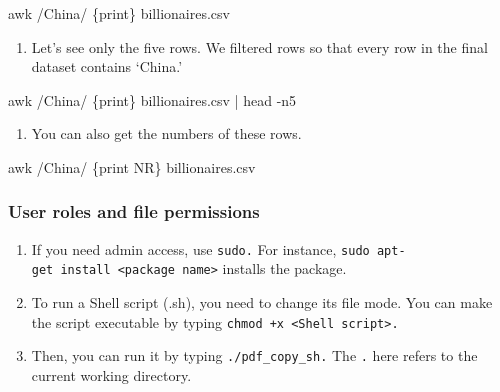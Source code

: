 \documentclass[
  letterpaper,
  DIV=11,
  numbers=noendperiod]{scrreprt}
\newenvironment{Shaded}{\begin{snugshade}}{\end{snugshade}}
\newcommand{\AttributeTok}[1]{\textcolor[rgb]{0.40,0.45,0.13}{#1}}
\newcommand{\FunctionTok}[1]{\textcolor[rgb]{0.28,0.35,0.67}{#1}}
\newcommand{\KeywordTok}[1]{\textcolor[rgb]{0.00,0.23,0.31}{#1}}
\newcommand{\NormalTok}[1]{\textcolor[rgb]{0.00,0.23,0.31}{#1}}
\newcommand{\StringTok}[1]{\textcolor[rgb]{0.13,0.47,0.30}{#1}}
\providecommand{\tightlist}{%
  \setlength{\itemsep}{0pt}\setlength{\parskip}{0pt}}\usepackage{longtable,booktabs,array}
\begin{document}
\begin{Shaded}
\begin{Highlighting}[]
\FunctionTok{awk} \StringTok{\textquotesingle{}/China/ \{print\}\textquotesingle{}}\NormalTok{ billionaires.csv}
\end{Highlighting}
\end{Shaded}

\begin{enumerate}
\def\labelenumi{\arabic{enumi}.}
\setcounter{enumi}{2}
\tightlist
\item
  Let's see only the five rows. We filtered rows so that every row in
  the final dataset contains `China.'
\end{enumerate}

\begin{Shaded}
\begin{Highlighting}[]
\FunctionTok{awk} \StringTok{\textquotesingle{}/China/ \{print\}\textquotesingle{}}\NormalTok{ billionaires.csv }\KeywordTok{|} \FunctionTok{head} \AttributeTok{{-}n5} 
\end{Highlighting}
\end{Shaded}

\begin{enumerate}
\def\labelenumi{\arabic{enumi}.}
\setcounter{enumi}{3}
\tightlist
\item
  You can also get the numbers of these rows.
\end{enumerate}

\begin{Shaded}
\begin{Highlighting}[]
\FunctionTok{awk} \StringTok{\textquotesingle{}/China/ \{print NR\}\textquotesingle{}}\NormalTok{ billionaires.csv }
\end{Highlighting}
\end{Shaded}

\hypertarget{user-roles-and-file-permissions}{%
\subsubsection*{User roles and file
permissions}\label{user-roles-and-file-permissions}}

\begin{enumerate}
\def\labelenumi{\arabic{enumi}.}
\item
  If you need admin access, use \texttt{sudo.} For instance,
  \texttt{sudo\ apt-get\ install\ \textless{}package\ name\textgreater{}}
  installs the package.
\item
  To run a Shell script (.sh), you need to change its file mode. You can
  make the script executable by typing
  \texttt{chmod\ +x\ \textless{}Shell\ script\textgreater{}.}
\item
  Then, you can run it by typing \texttt{./pdf\_copy\_sh.} The
  \texttt{.} here refers to the current working directory.
\end{enumerate}
\end{document}

